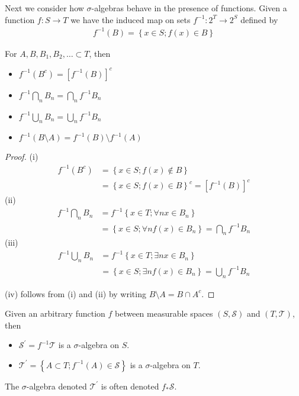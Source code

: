 Next we consider how $\sigma$-algebras behave in the presence of
functions.  Given a function $f:S \to T$ we have the induced map on
sets $f^{-1}: 2^T \to 2^S$ defined by 
\begin{align*}
f^{-1}(B) = \left \{x \in S; f(x) \in B \right \}
\end{align*}
\begin{lem}\label{SetOperationsUnderPullback}For $A, B,B_1,B_2,\dots
  \subset T$, then 
\begin{itemize}
\item[(i)] $f^{-1}(B^c) = \left[
    f^{-1}(B) \right ]^c$
\item[(ii)] $f^{-1} \bigcap_n B_n = \bigcap_n f^{-1}
  B_n$
\item[(iii)] $f^{-1} \bigcup_n B_n = \bigcup_n f^{-1}
  B_n$
\item[(iv)]$f^{-1}(B \setminus A) = f^{-1}(B) \setminus f^{-1}(A)$
\end{itemize}
\end{lem}
\begin{proof}
(i)\begin{align*}
f^{-1}(B^c) &= \left \{x \in S; f(x) \notin B \right \} \\
&= \left \{x \in S; f(x) \in B \right \}^c = \left[ f^{-1}(B) \right ]^c
\end{align*}
(ii)\begin{align*}
f^{-1} \bigcap_n B_n &= f^{-1} \left \{x \in T ; \forall n x \in B_n
\right \} \\
& = \left \{x \in S; \forall n f(x) \in B_n \right \} = \bigcap_n f^{-1}  B_n
\end{align*}
(iii)\begin{align*}
f^{-1} \bigcup_n B_n &= f^{-1} \left \{x \in T ; \exists n x \in B_n
\right \} \\
& = \left \{x \in S; \exists n f(x) \in B_n \right \} = \bigcup_n f^{-1}  B_n
\end{align*}

(iv) follows from (i) and (ii) by writing $B \setminus A = B \cap A^c$.
\end{proof}
\begin{lem}\label{SigmaAlgebraPullback}Given an arbitrary function $f$ between measurable spaces
  $(S,\mathcal{S})$ and $(T,\mathcal{T})$, then
\begin{itemize}
\item[(i)] $\mathcal{S}^\prime = f^{-1} \mathcal{T}$ is a
  $\sigma$-algebra on $S$.
\item[(ii)] $\mathcal{T}^\prime = \left \{A \subset T ; f^{-1}(A) \in
      \mathcal{S} \right \}$ is a $\sigma$-algebra on $T$.
\end{itemize}
The $\sigma$-algebra denoted $\mathcal{T}^\prime$ is often denoted
$f_* \mathcal{S}$.
\end{lem}
